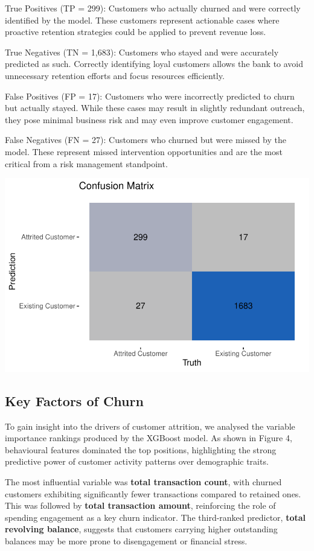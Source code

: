 \documentclass[
  letterpaper,
  DIV=11,
  numbers=noendperiod]{scrartcl}
\begin{document}
True Positives (TP = 299): Customers who actually churned and were
correctly identified by the model. These customers represent actionable
cases where proactive retention strategies could be applied to prevent
revenue loss.

True Negatives (TN = 1,683): Customers who stayed and were accurately
predicted as such. Correctly identifying loyal customers allows the bank
to avoid unnecessary retention efforts and focus resources efficiently.

False Positives (FP = 17): Customers who were incorrectly predicted to
churn but actually stayed. While these cases may result in slightly
redundant outreach, they pose minimal business risk and may even improve
customer engagement.

False Negatives (FN = 27): Customers who churned but were missed by the
model. These represent missed intervention opportunities and are the
most critical from a risk management standpoint.

\includegraphics{v4_files/figure-pdf/unnamed-chunk-18-1.pdf}

\subsection{Key Factors of Churn}\label{key-factors-of-churn}

To gain insight into the drivers of customer attrition, we analysed the
variable importance rankings produced by the XGBoost model. As shown in
Figure 4, behavioural features dominated the top positions, highlighting
the strong predictive power of customer activity patterns over
demographic traits.

The most influential variable was \textbf{total transaction count}, with
churned customers exhibiting significantly fewer transactions compared
to retained ones. This was followed by \textbf{total transaction
amount}, reinforcing the role of spending engagement as a key churn
indicator. The third-ranked predictor, \textbf{total revolving balance},
suggests that customers carrying higher outstanding balances may be more
prone to disengagement or financial stress.
\end{document}
